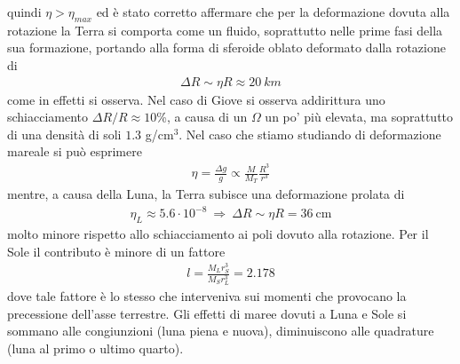 \documentclass[a4paper, oneside]{book}
\begin{document}
quindi $\eta > \eta_{max}$  ed è stato corretto affermare che per la deformazione 
dovuta alla rotazione la Terra si comporta come un fluido, soprattutto nelle 
prime fasi della sua formazione, portando alla forma di sferoide oblato deformato dalla 
rotazione di  
\begin{gather*}
    \Delta R \sim \eta R \approx 20 \ km
\end{gather*}
come in effetti si osserva. Nel caso di Giove si osserva 
addirittura uno schiacciamento $\Delta R / R \approx 10$\%, a causa di un $\Omega$ 
un po' più elevata, ma soprattutto di una densità di soli $1.3$ g/cm$^{3}$. 
Nel caso che stiamo studiando di deformazione mareale si può esprimere
\begin{gather*}
    \eta = \frac{\Delta g}{g} \propto \frac{M}{M_T}\frac{R^{3}}{r^{3}}
\end{gather*}
mentre, a causa della Luna, la Terra subisce una deformazione prolata di
\begin{gather*}
    \eta_L \approx 5.6 \cdot 10^{-8} \ \Longrightarrow \ \Delta R \sim\eta R = 36 \ \text{cm}
\end{gather*}
molto minore rispetto allo schiacciamento ai poli 
dovuto alla rotazione. Per il Sole il contributo è minore di un fattore
\begin{gather*}
    l = \frac{M_Lr_S^{3}}{M_S r_L^{3}} = 2.178
\end{gather*}
dove tale fattore è lo stesso che interveniva sui momenti che provocano la precessione dell'asse terrestre. 
Gli effetti di maree dovuti a Luna e Sole si sommano alle congiunzioni 
(luna piena e nuova), diminuiscono alle quadrature (luna al primo o ultimo quarto). 
\end{document}

